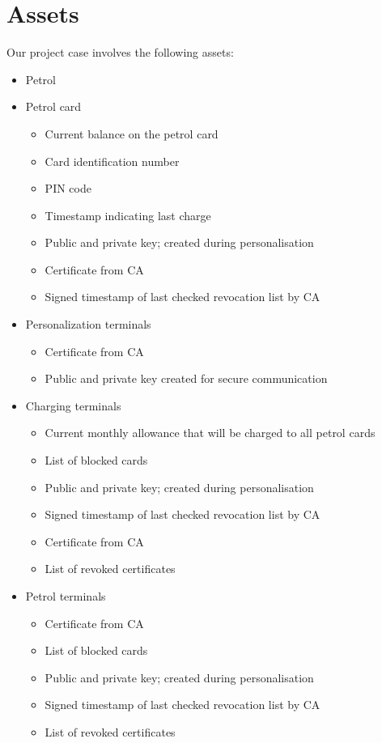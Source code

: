 \section{Assets}
Our project case involves the following assets:
\begin{itemize}
\item Petrol

\item Petrol card
\begin{itemize}
 \item Current balance on the petrol card
 \item Card identification number
 \item PIN code
 \item Timestamp indicating last charge
 \item Public and private key; created during personalisation
 \item Certificate from CA
 \item Signed timestamp of last checked revocation list by CA
\end{itemize}

 \item Personalization terminals
 \begin{itemize}
	\item Certificate from CA
	\item Public and private key created for secure communication
 \end{itemize}
 
 \item Charging terminals
 \begin{itemize}
 	\item Current monthly allowance that will be charged to all petrol cards
 	\item List of blocked cards
 	\item Public and private key; created during personalisation
 	\item Signed timestamp of last checked revocation list by CA
  	\item Certificate from CA
	\item List of revoked certificates
 \end{itemize}

 
 \item Petrol terminals
 \begin{itemize}
  	\item Certificate from CA
 	\item List of blocked cards
 	\item Public and private key; created during personalisation
 	\item Signed timestamp of last checked revocation list by CA
 	\item List of revoked certificates
 \end{itemize}


\end{itemize}
